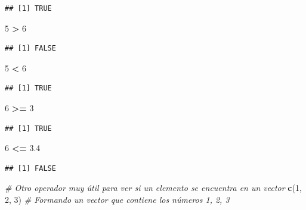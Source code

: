 \documentclass[]{book}
\newenvironment{Shaded}{\begin{snugshade}}{\end{snugshade}}
\newcommand{\KeywordTok}[1]{\textcolor[rgb]{0.13,0.29,0.53}{\textbf{#1}}}
\newcommand{\DecValTok}[1]{\textcolor[rgb]{0.00,0.00,0.81}{#1}}
\newcommand{\FloatTok}[1]{\textcolor[rgb]{0.00,0.00,0.81}{#1}}
\newcommand{\StringTok}[1]{\textcolor[rgb]{0.31,0.60,0.02}{#1}}
\newcommand{\CommentTok}[1]{\textcolor[rgb]{0.56,0.35,0.01}{\textit{#1}}}
\newcommand{\OperatorTok}[1]{\textcolor[rgb]{0.81,0.36,0.00}{\textbf{#1}}}
\newcommand{\NormalTok}[1]{#1}
\theoremstyle{definition}
\theoremstyle{definition}
\theoremstyle{definition}
\theoremstyle{remark}
\begin{document}
\begin{verbatim}
## [1] TRUE
\end{verbatim}

\begin{Shaded}
\begin{Highlighting}[]
\DecValTok{5} \OperatorTok{>}\StringTok{ }\DecValTok{6}
\end{Highlighting}
\end{Shaded}

\begin{verbatim}
## [1] FALSE
\end{verbatim}

\begin{Shaded}
\begin{Highlighting}[]
\DecValTok{5} \OperatorTok{<}\StringTok{ }\DecValTok{6}
\end{Highlighting}
\end{Shaded}

\begin{verbatim}
## [1] TRUE
\end{verbatim}

\begin{Shaded}
\begin{Highlighting}[]
\DecValTok{6} \OperatorTok{>=}\StringTok{ }\DecValTok{3}
\end{Highlighting}
\end{Shaded}

\begin{verbatim}
## [1] TRUE
\end{verbatim}

\begin{Shaded}
\begin{Highlighting}[]
\DecValTok{6} \OperatorTok{<=}\StringTok{ }\FloatTok{3.4}
\end{Highlighting}
\end{Shaded}

\begin{verbatim}
## [1] FALSE
\end{verbatim}

\begin{Shaded}
\begin{Highlighting}[]
\CommentTok{# Otro operador muy útil para ver si un elemento se encuentra en un vector}
\KeywordTok{c}\NormalTok{(}\DecValTok{1}\NormalTok{, }\DecValTok{2}\NormalTok{, }\DecValTok{3}\NormalTok{) }\CommentTok{# Formando un vector que contiene los números 1, 2, 3}
\end{Highlighting}
\end{Shaded}
\end{document}
